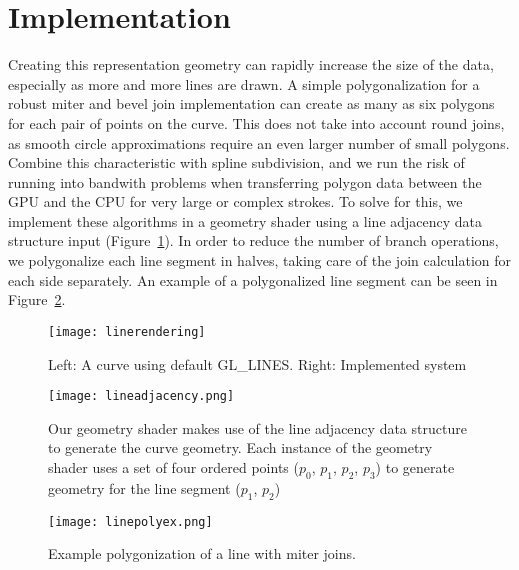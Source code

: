\section{Implementation}

Creating this representation geometry can rapidly increase the size of the data, especially as more and more lines are drawn. 
A simple polygonalization for a robust miter and bevel join implementation can create as many as six polygons for each pair of points on the curve.
This does not take into account round joins, as smooth circle approximations require an even larger number of small polygons.
Combine this characteristic with spline subdivision, and we run the risk of running into bandwith problems when transferring polygon data between the GPU and the CPU for very large or complex strokes.
To solve for this, we implement these algorithms in a geometry shader using a line adjacency data structure input (Figure~\ref{fig:lineadjacency}).
In order to reduce the number of branch operations, we polygonalize each line segment in halves, taking care of the join calculation for each side separately.
An example of a polygonalized line segment can be seen in Figure~\ref{fig:linepoly}.

\begin{figure}
\texttt{[image: linerendering]}
\caption{Left: A curve using default GL\_LINES. Right: Implemented system}
\end{figure}

\begin{figure}
\label{fig:lineadjacency}
	\begin{center}
		\texttt{[image: lineadjacency.png]}
	\end{center}
	\caption[Line Adjacency data structure]{Our geometry shader makes use of the line adjacency data structure to generate the curve geometry. Each instance of the geometry shader uses a set of four ordered points ($p_0$, $p_1$, $p_2$, $p_3$) to generate geometry for the line segment ($p_1$, $p_2$)}
\end{figure}
\begin{figure}
\label{fig:linepoly}
	\texttt{[image: linepolyex.png]}
	\caption{Example polygonization of a line with miter joins.}
\end{figure}



